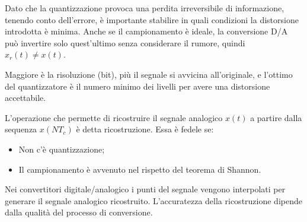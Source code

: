 Dato che la quantizzazione provoca una perdita irreversibile di informazione, tenendo conto dell'errore, è importante stabilire in quali condizioni la distorsione introdotta è minima. Anche se il campionamento è ideale, la conversione D/A può invertire solo quest'ultimo senza considerare il rumore, quindi $x_r(t) \neq x(t)$.

Maggiore è la risoluzione (bit), più il segnale si avvicina all'originale, e l'ottimo del quantizzatore è il numero minimo dei livelli per avere una distorsione accettabile.

L'operazione che permette di ricostruire il segnale analogico $x(t)$ a partire dalla sequenza $x(NT_c)$ è detta ricostruzione. Essa è fedele se:
\begin{itemize}
	\item Non c'è quantizzazione;
	\item Il campionamento è avvenuto nel rispetto del teorema di Shannon.
\end{itemize}
Nei convertitori digitale/analogico i punti del segnale vengono interpolati per generare il segnale analogico ricostruito. L'accuratezza della ricostruzione dipende dalla qualità del processo di conversione.
